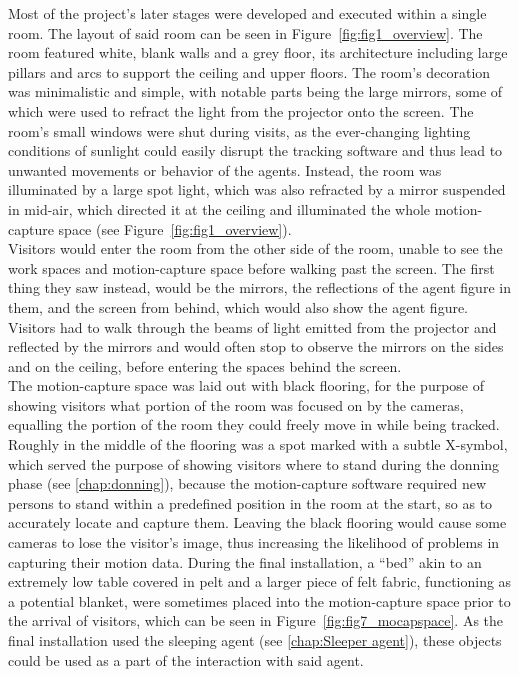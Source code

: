 \documentclass[draft,final]{vutinfth} %
\begin{document}
Most of the project’s later stages were developed and executed within a single room. 
The layout of said room can be seen in Figure~\ref{fig:fig1_overview}. 
The room featured white, blank walls and a grey floor, its architecture including large pillars and arcs to support the ceiling and upper floors. 
The room’s decoration was minimalistic and simple, with notable parts being the large mirrors, some of which were used to refract the light from the projector onto the screen. 
The room’s small windows were shut during visits, as the ever-changing lighting conditions of sunlight could easily disrupt the tracking software and thus lead to unwanted movements or behavior of the agents. 
Instead, the room was illuminated by a large spot light, which was also refracted by a mirror suspended in mid-air, which directed it at the ceiling and illuminated the whole motion-capture space (see Figure~\ref{fig:fig1_overview}). \\
Visitors would enter the room from the other side of the room, unable to see the work spaces and motion-capture space before walking past the screen. 
The first thing they saw instead, would be the mirrors, the reflections of the agent figure in them, and the screen from behind, which would also show the agent figure. 
Visitors had to walk through the beams of light emitted from the projector and reflected by the mirrors and would often stop to observe the mirrors on the sides and on the ceiling, before entering the spaces behind the screen. \\
The motion-capture space was laid out with black flooring, for the purpose of showing visitors what portion of the room was focused on by the cameras, equalling the portion of the room they could freely move in while being tracked. 
Roughly in the middle of the flooring was a spot marked with a subtle X-symbol, which served the purpose of showing visitors where to stand during the donning phase (see \autoref{chap:donning}), because the motion-capture software required new persons to stand within a predefined position in the room at the start, so as to accurately locate and capture them. 
Leaving the black flooring would cause some cameras to lose the visitor’s image, thus increasing the likelihood of problems in capturing their motion data. 
During the final installation, a “bed” akin to an extremely low table covered in pelt and a larger piece of felt fabric, functioning as a potential blanket, were sometimes placed into the motion-capture space prior to the arrival of visitors, which can be seen in Figure~\ref{fig:fig7_mocapspace}. 
As the final installation used the sleeping agent (see \autoref{chap:Sleeper agent}), these objects could be used as a part of the interaction with said agent.
\end{document}
